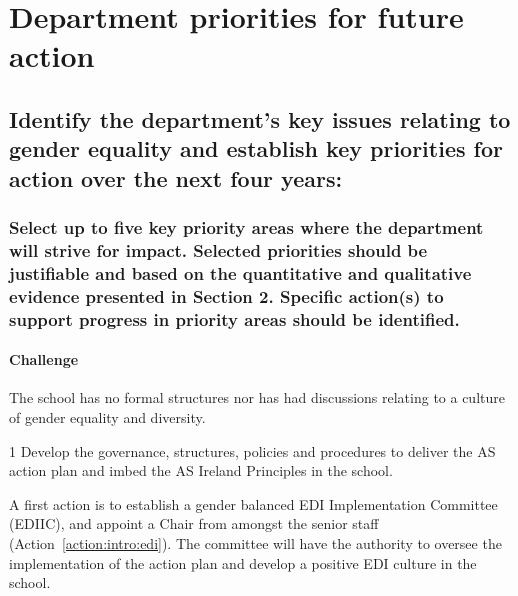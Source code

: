 \section{Department priorities for future action}
\label{sec:priorities}

\subsection{Identify the department’s key issues relating to gender equality and establish key priorities for action over the next four years:} 





\subsubsection{Select up to five key priority areas where the department will strive for impact.
Selected priorities should be justifiable and based on the quantitative and qualitative
evidence presented in Section 2. Specific action(s) to support progress in priority areas should be identified.}





\paragraph{Challenge}
The school has no formal structures nor has had discussions relating to a culture of gender equality and diversity. 

\begin{priority}{1}
 Develop the governance, structures, policies and procedures to deliver the AS action plan and imbed the AS Ireland Principles in the school.
\hfill{
    \hypersetup{hidelinks}
    \hyperlink{p1}{\gotoactionsymbol{}}
}
\end{priority}


A first action is to establish a gender balanced EDI Implementation Committee (EDIIC), and appoint a Chair from amongst the senior staff (Action~\ref{action:intro:edi}). The committee will have the authority to oversee the implementation of the action plan and develop a positive EDI culture in the school. 


